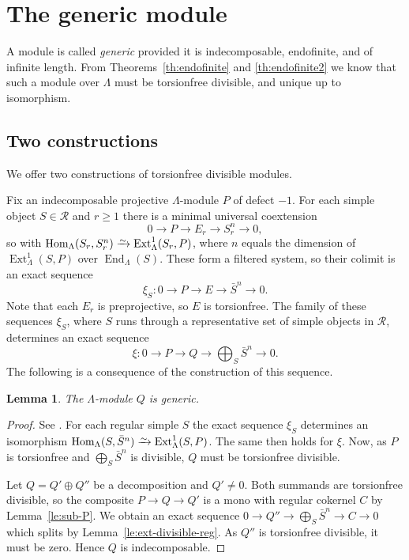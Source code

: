\documentclass[a4paper]{amsart}
\theoremstyle{plain}
\newtheorem{lem}[thm]{Lemma}
\theoremstyle{definition}
\theoremstyle{remark}
\numberwithin{equation}{section}
\newcommand{\End}{\operatorname{End}}
\newcommand{\Ext}{\operatorname{Ext}}
\newcommand{\Hom}{\operatorname{Hom}}
\newcommand{\iso}{\xrightarrow{\raisebox{-.4ex}[0ex][0ex]{$\scriptstyle{\sim}$}}}
\def\R{\mathcal R}
\begin{document}
\section{The generic module}

A module is called \emph{generic} provided it is indecomposable, endofinite, and of infinite length. From Theorems~\ref{th:endofinite} and \ref{th:endofinite2} we know that such a module over $\Lambda$ must be torsionfree divisible, and unique up to isomorphism.
  
\subsection*{Two constructions}

We offer two constructions of torsionfree divisible modules. 

Fix an indecomposable projective $\Lambda$-module $P$ of defect $-1$. For each simple object $S\in\R$ and $r\geq1$ there is a minimal universal coextension
\[ 0 \to P\to E_r \to S_r^{n} \to 0, \]
so with $\Hom_\Lambda(S_r,S_r^{n})\iso\Ext^1_\Lambda(S_r,P)$, where $n$ equals the dimension of $\Ext^1_\Lambda(S,P)$ over $\End_\Lambda(S)$. These form a filtered system, so their colimit is an exact sequence
\[ \xi_S \colon 0 \to P\to E \to \bar S^{n} \to 0. \]
Note that each $E_r$ is preprojective, so $E$ is torsionfree. The family of these sequences $\xi_S$, where $S$ runs through a representative set of simple objects in $\R$, determines an exact sequence
\[ \xi \colon 0 \to P \to Q \to \bigoplus\nolimits_S\bar S^n \to 0. \]
The following is a consequence of the construction of this sequence.

\begin{lem}\label{le:generic-construction}
The $\Lambda$-module $Q$ is generic.
\end{lem}

\begin{proof}
See \cite[5.2]{Ri1979}.  For each regular simple $S$ the exact sequence $\xi_S$ determines an isomorphism $\Hom_\Lambda(S,\bar S^{n})\iso\Ext^1_\Lambda(S,P)$. The same then holds for $\xi$. Now, as $P$ is torsionfree and $\bigoplus_S\bar S^{n}$ is divisible, $Q$ must be torsionfree divisible.

Let $Q=Q'\oplus Q''$ be a decomposition and $Q'\neq0$. Both summands are torsionfree divisible, so the composite $P\to Q\to Q'$ is a mono with regular cokernel $C$ by Lemma~\ref{le:sub-P}. We obtain an exact sequence $0 \to Q'' \to \bigoplus\nolimits_S\bar S^n \to C\to 0$ which splits by Lemma~\ref{le:ext-divisible-reg}. As $Q''$ is torsionfree divisible, it must be zero. Hence $Q$ is indecomposable.
\end{proof}
\end{document}
